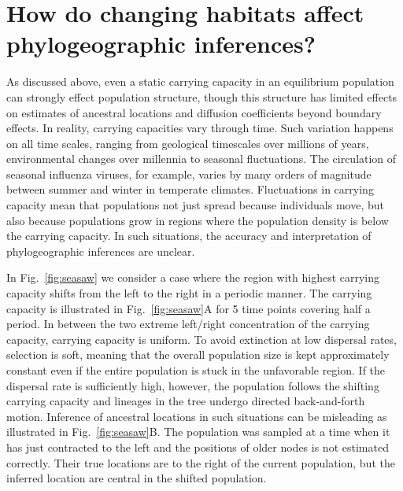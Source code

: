 \documentclass[aps,rmp, twocolumn]{revtex4}
\begin{document}
\section*{How do changing habitats affect phylogeographic inferences?}
As discussed above, even a static carrying capacity in an equilibrium population can strongly effect population structure, though this structure has limited effects on estimates of ancestral locations and diffusion coefficients beyond boundary effects.
In reality, carrying capacities vary through time.
Such variation happens on all time scales, ranging from geological timescales over millions of years, environmental changes over millennia to seasonal fluctuations.
The circulation of seasonal influenza viruses, for example, varies by many orders of magnitude between summer and winter in temperate climates.
Fluctuations in carrying capacity mean that populations not just spread because individuals move, but also because populations grow in regions where the population density is below the carrying capacity.
In such situations, the accuracy and interpretation of phylogeographic inferences are unclear.

In Fig.~\ref{fig:seasaw} we consider a case where the region with highest carrying capacity shifts from the left to the right in a periodic manner.
The carrying capacity is illustrated in Fig.~\ref{fig:seasaw}A for 5 time points covering half a period.
In between the two extreme left/right concentration of the carrying capacity, carrying capacity is uniform.
To avoid extinction at low dispersal rates, selection is soft, meaning that the overall population size is kept approximately constant even if the entire population is stuck in the unfavorable region.
If the dispersal rate is sufficiently high, however, the population follows the shifting carrying capacity and lineages in the tree undergo directed back-and-forth motion.
Inference of ancestral locations in such situations can be misleading as illustrated in Fig.~\ref{fig:seasaw}B.
The population was sampled at a time when it has just contracted to the left and the positions of older nodes is not estimated correctly.
Their true locations are to the right of the current population, but the inferred location are central in the shifted population.
\end{document}
